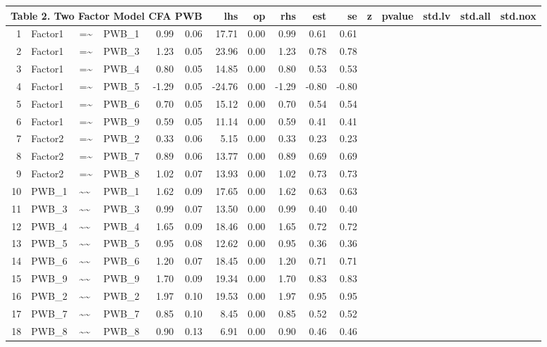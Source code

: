 \documentclass{article}
\begin{document}
\begin{table}[ht]
\centering
\begin{tabular}{rlllrrrrrrr}
 \multicolumn{ 6 }{l}{ Table 2. Two Factor Model CFA PWB} \cr 
  \hline
 & lhs & op & rhs & est & se & z & pvalue & std.lv & std.all & std.nox \\ 
  \hline
1 & Factor1 & =\~{} & PWB\_1 & 0.99 & 0.06 & 17.71 & 0.00 & 0.99 & 0.61 & 0.61 \\ 
  2 & Factor1 & =\~{} & PWB\_3 & 1.23 & 0.05 & 23.96 & 0.00 & 1.23 & 0.78 & 0.78 \\ 
  3 & Factor1 & =\~{} & PWB\_4 & 0.80 & 0.05 & 14.85 & 0.00 & 0.80 & 0.53 & 0.53 \\ 
  4 & Factor1 & =\~{} & PWB\_5 & -1.29 & 0.05 & -24.76 & 0.00 & -1.29 & -0.80 & -0.80 \\ 
  5 & Factor1 & =\~{} & PWB\_6 & 0.70 & 0.05 & 15.12 & 0.00 & 0.70 & 0.54 & 0.54 \\ 
  6 & Factor1 & =\~{} & PWB\_9 & 0.59 & 0.05 & 11.14 & 0.00 & 0.59 & 0.41 & 0.41 \\ 
  7 & Factor2 & =\~{} & PWB\_2 & 0.33 & 0.06 & 5.15 & 0.00 & 0.33 & 0.23 & 0.23 \\ 
  8 & Factor2 & =\~{} & PWB\_7 & 0.89 & 0.06 & 13.77 & 0.00 & 0.89 & 0.69 & 0.69 \\ 
  9 & Factor2 & =\~{} & PWB\_8 & 1.02 & 0.07 & 13.93 & 0.00 & 1.02 & 0.73 & 0.73 \\ 
  10 & PWB\_1 & \~{}\~{} & PWB\_1 & 1.62 & 0.09 & 17.65 & 0.00 & 1.62 & 0.63 & 0.63 \\ 
  11 & PWB\_3 & \~{}\~{} & PWB\_3 & 0.99 & 0.07 & 13.50 & 0.00 & 0.99 & 0.40 & 0.40 \\ 
  12 & PWB\_4 & \~{}\~{} & PWB\_4 & 1.65 & 0.09 & 18.46 & 0.00 & 1.65 & 0.72 & 0.72 \\ 
  13 & PWB\_5 & \~{}\~{} & PWB\_5 & 0.95 & 0.08 & 12.62 & 0.00 & 0.95 & 0.36 & 0.36 \\ 
  14 & PWB\_6 & \~{}\~{} & PWB\_6 & 1.20 & 0.07 & 18.45 & 0.00 & 1.20 & 0.71 & 0.71 \\ 
  15 & PWB\_9 & \~{}\~{} & PWB\_9 & 1.70 & 0.09 & 19.34 & 0.00 & 1.70 & 0.83 & 0.83 \\ 
  16 & PWB\_2 & \~{}\~{} & PWB\_2 & 1.97 & 0.10 & 19.53 & 0.00 & 1.97 & 0.95 & 0.95 \\ 
  17 & PWB\_7 & \~{}\~{} & PWB\_7 & 0.85 & 0.10 & 8.45 & 0.00 & 0.85 & 0.52 & 0.52 \\ 
  18 & PWB\_8 & \~{}\~{} & PWB\_8 & 0.90 & 0.13 & 6.91 & 0.00 & 0.90 & 0.46 & 0.46 \\ 

\end{tabular}
\end{table}
\end{document}
